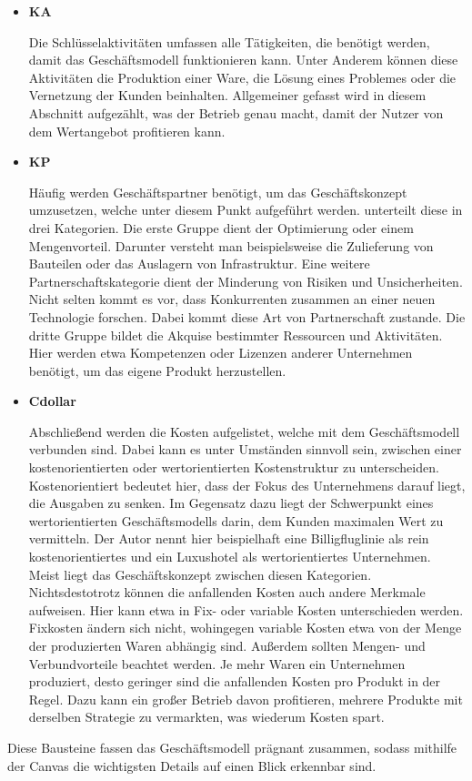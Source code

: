 \begin{itemize}
	\item \textbf{\ac{KA}}
	
	Die Schlüsselaktivitäten umfassen alle Tätigkeiten, die benötigt werden, damit das Geschäftsmodell funktionieren kann. Unter Anderem können diese Aktivitäten die Produktion einer Ware, die Lösung eines Problemes oder die Vernetzung der Kunden beinhalten. Allgemeiner gefasst wird in diesem Abschnitt aufgezählt, was der Betrieb genau macht, damit der Nutzer von dem Wertangebot profitieren kann.
	
	\item \textbf{\ac{KP}}
	
	Häufig werden Geschäftspartner benötigt, um das Geschäftskonzept umzusetzen, welche unter diesem Punkt aufgeführt werden. \citeauthor{BusinessModelGeneration} unterteilt diese in drei Kategorien. Die erste Gruppe dient der Optimierung oder einem Mengenvorteil. Darunter versteht man beispielsweise die Zulieferung von Bauteilen oder das Auslagern von Infrastruktur. Eine weitere Partnerschaftskategorie dient der Minderung von Risiken und Unsicherheiten. Nicht selten kommt es vor, dass Konkurrenten zusammen an einer neuen Technologie forschen. Dabei kommt diese Art von Partnerschaft zustande. Die dritte Gruppe bildet die Akquise bestimmter Ressourcen und Aktivitäten. Hier werden etwa Kompetenzen oder Lizenzen anderer Unternehmen benötigt, um das eigene Produkt herzustellen.
	
	\item \textbf{\ac{Cdollar}}
	
	Abschließend werden die Kosten aufgelistet, welche mit dem Geschäftsmodell verbunden sind. Dabei kann es unter Umständen sinnvoll sein, zwischen einer kostenorientierten oder wertorientierten Kostenstruktur zu unterscheiden. Kostenorientiert bedeutet hier, dass der Fokus des Unternehmens darauf liegt, die Ausgaben zu senken. Im Gegensatz dazu liegt der Schwerpunkt eines wertorientierten Geschäftsmodells darin, dem Kunden maximalen Wert zu vermitteln. Der Autor nennt hier beispielhaft eine Billigfluglinie als rein kostenorientiertes und ein Luxushotel als wertorientiertes Unternehmen. Meist liegt das Geschäftskonzept zwischen diesen Kategorien. Nichtsdestotrotz können die anfallenden Kosten auch andere Merkmale aufweisen. Hier kann etwa in Fix- oder variable Kosten unterschieden werden. Fixkosten ändern sich nicht, wohingegen variable Kosten etwa von der Menge der produzierten Waren abhängig sind. Außerdem sollten Mengen- und Verbundvorteile beachtet werden. Je mehr Waren ein Unternehmen produziert, desto geringer sind die anfallenden Kosten pro Produkt in der Regel. Dazu kann ein großer Betrieb davon profitieren, mehrere Produkte mit derselben Strategie zu vermarkten, was wiederum Kosten spart.
	
\end{itemize}

Diese Bausteine fassen das Geschäftsmodell prägnant zusammen, sodass mithilfe der Canvas die wichtigsten Details auf einen Blick erkennbar sind.
\cite[S. 13-51]{BusinessModelGeneration}